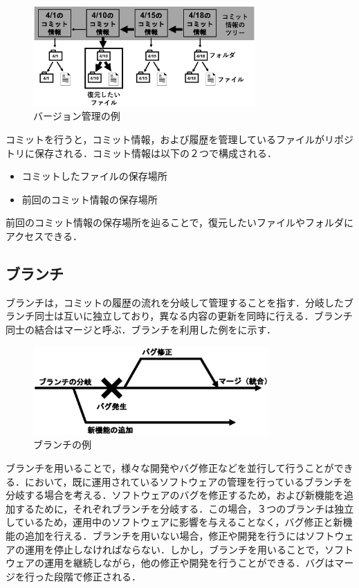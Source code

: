\documentclass[a4j,9pt,twocolumn]{jsarticle}
\begin{document}
\begin{figure}[h]
\centering
\includegraphics[width=85mm]{img/tree.eps}
\caption{バージョン管理の例}
\label{tree}
\end{figure}

コミットを行うと，コミット情報，および履歴を管理しているファイルがリポジトリに保存される．コミット情報は以下の２つで構成される．

\begin{itemize}
\item コミットしたファイルの保存場所
\item 前回のコミット情報の保存場所
\end{itemize}

前回のコミット情報の保存場所を辿ることで，復元したいファイルやフォルダにアクセスできる．

\subsection{ブランチ}
ブランチは，コミットの履歴の流れを分岐して管理することを指す．分岐したブランチ同士は互いに独立しており，異なる内容の更新を同時に行える．ブランチ同士の結合はマージと呼ぶ．ブランチを利用した例をに示す．

\begin{figure}[h]
\centering
\includegraphics[width=90mm]{img/branch.eps}
\caption{ブランチの例}
\label{branch_ex}
\end{figure}

ブランチを用いることで，様々な開発やバグ修正などを並行して行うことができる．において，既に運用されているソフトウェアの管理を行っているブランチを分岐する場合を考える．ソフトウェアのバグを修正するため，および新機能を追加するために，それぞれブランチを分岐する．この場合，３つのブランチは独立しているため，運用中のソフトウェアに影響を与えることなく，バグ修正と新機能の追加を行える．ブランチを用いない場合，修正や開発を行うにはソフトウェアの運用を停止しなければならない．しかし，ブランチを用いることで，ソフトウェアの運用を継続しながら，他の修正や開発を行うことができる．バグはマージを行った段階で修正される．
\end{document}
